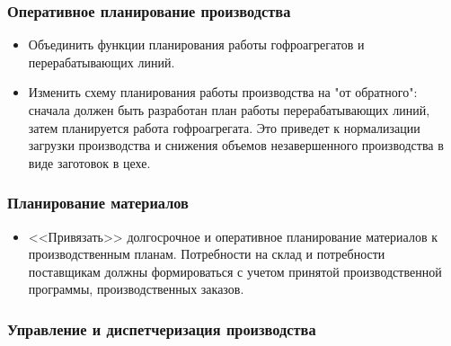 \subsubsection{Оперативное планирование производства}
\begin{itemize}
\item Объединить функции планирования работы гофроагрегатов и перерабатывающих линий. 

\item  Изменить схему планирования работы производства на "от обратного": сначала должен быть разработан план работы перерабатывающих линий, затем планируется работа гофроагрегата. Это приведет к нормализации загрузки производства и снижения объемов незавершенного производства в виде заготовок в цехе.
\end{itemize}

\subsubsection{Планирование материалов}

\begin{itemize}
 \item <<Привязать>> долгосрочное и оперативное планирование материалов к производственным планам. Потребности на склад и потребности поставщикам должны формироваться с учетом принятой производственной программы, производственных заказов. 
\end{itemize}


 \subsubsection{Управление и диспетчеризация производства}

